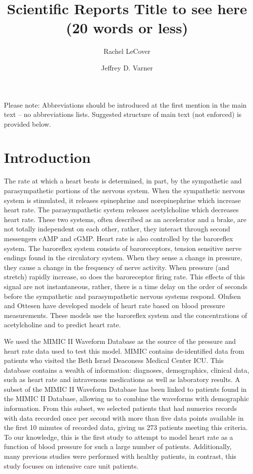 \documentclass[fleqn,10pt]{wlscirep}
\title{Scientific Reports Title to see here (20 words or less)}
\author[1]{Rachel LeCover}
\author[1,*]{Jeffrey D. Varner}
\affil[1]{Affiliation, School of Chemical and Biomolecular Engineering, Ithaca NY, 14852, USA}
\affil[*]{jdv27@cornell.edu}
\begin{document}
\flushbottom
\maketitle
%
%
\thispagestyle{empty}
\noindent Please note: Abbreviations should be introduced at the first mention in the main text – no abbreviations lists. Suggested structure of main text (not enforced) is provided below.
\section*{Introduction}
The rate at which a heart beats is determined, in part, by the sympathetic and parasympathetic portions of the nervous system. When the sympathetic nervous system is stimulated, it releases epinephrine and norepinephrine  which increase heart rate. The parasympathetic system releases acetylcholine which decreases heart rate.  These two systems, often described as an accelerator and a brake, are not totally independent on each other, rather, they interact through second messengers cAMP and cGMP. \cite{olshansky2008parasympathetic}
Heart rate is also controlled by the baroreflex system. The baroreflex system consists of baroreceptors, tension sensitive nerve endings found in the circulatory system. \cite{ottesen1997modelling} When they sense a change in pressure, they cause a change in the frequency of nerve activity. When pressure (and stretch) rapidly increase, so does the baroreceptor firing rate. \cite{negative1999reflexes} This effects of this signal are not instantaneous, rather, there is a time delay on the order of seconds before the sympathetic and parasympathetic nervous systems respond. \cite{ottesen1997modelling}
Olufsen and Ottesen have developed models of heart rate based on blood pressure measurements.\cite{olufsen2013practical} These models use the baroreflex system and the concentrations of acetylcholine and to predict heart rate. 

We used the MIMIC II Waveform Database as the source of the pressure and heart rate data used to test this model.\cite{saeed2011multiparameter} MIMIC contains de-identified data from patients who visited the Beth Israel Deaconess Medical Center ICU. This database contains a wealth of information: diagnoses, demographics, clinical data, such as heart rate and intravenous medications as well as laboratory results.  
A subset of the MIMIC II Waveform Database has been linked to patients found in the MIMIC II Database, allowing us to combine the waveforms with demographic information. From this subset, we selected patients that had numerics records with data recorded once per second with more than five data points available in the first 10 minutes of recorded data, giving us 273 patients meeting this criteria.
To our knowledge, this is the first study to attempt to model heart rate as a function of blood pressure for such a large number of patients. Additionally, many previous studies were performed with healthy patients, in contrast, this study focuses on intensive care unit patients. 
\end{document}
